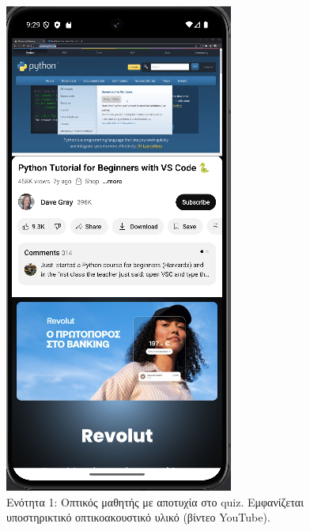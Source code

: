 \documentclass[11pt]{report}
\begin{document}
\begin{figure}[H]
  \vspace{0.5cm}

  \begin{minipage}[b]{0.9\linewidth}
    \centering
    \includegraphics[width=\linewidth, height=0.35\textheight, keepaspectratio]{Figures/εικόνα (2).png}
    \caption{Ενότητα 1: Οπτικός μαθητής με αποτυχία στο quiz. Εμφανίζεται υποστηρικτικό οπτικοακουστικό υλικό (βίντεο YouTube).}
  \end{minipage}
\end{figure}
\end{document}
